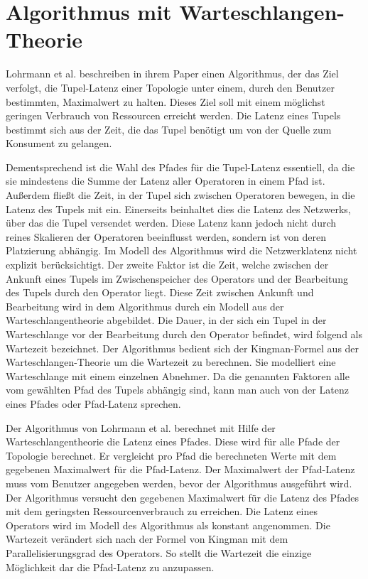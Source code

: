\chapter{Algorithmus mit Warteschlangen-Theorie}

Lohrmann et al. beschreiben in ihrem Paper \cite{lohrmann_elastic_2015} einen Algorithmus, der das Ziel verfolgt, die Tupel-Latenz einer Topologie unter einem, durch den Benutzer bestimmten, Maximalwert zu halten.
Dieses Ziel soll mit einem möglichst geringen Verbrauch von Ressourcen erreicht werden.
Die Latenz eines Tupels bestimmt sich aus der Zeit, die das Tupel benötigt um von der Quelle zum Konsument zu gelangen.

Dementsprechend ist die Wahl des Pfades für die Tupel-Latenz essentiell, da die sie mindestens die Summe der Latenz aller Operatoren in einem Pfad ist.
Außerdem fließt die Zeit, in der Tupel sich zwischen Operatoren bewegen, in die Latenz des Tupels mit ein.
Einerseits beinhaltet dies die Latenz des Netzwerks, über das die Tupel versendet werden.
Diese Latenz kann jedoch nicht durch reines Skalieren der Operatoren beeinflusst werden, sondern ist von deren Platzierung abhängig.
Im Modell des Algorithmus wird die Netzwerklatenz nicht explizit berücksichtigt.
Der zweite Faktor ist die Zeit, welche zwischen der Ankunft eines Tupels im Zwischenspeicher des Operators und der Bearbeitung des Tupels durch den Operator liegt.
Diese Zeit zwischen Ankunft und Bearbeitung wird in dem Algorithmus durch ein Modell aus der Warteschlangentheorie abgebildet.
Die Dauer, in der sich ein Tupel in der Warteschlange vor der Bearbeitung durch den Operator befindet, wird folgend als Wartezeit bezeichnet.
Der Algorithmus bedient sich der Kingman-Formel aus der Warteschlangen-Theorie um die Wartezeit zu berechnen.
Sie modelliert eine Warteschlange mit einem einzelnen Abnehmer.
Da die genannten Faktoren alle vom gewählten Pfad des Tupels abhängig sind, kann man auch von der Latenz eines Pfades oder Pfad-Latenz sprechen.

Der Algorithmus von Lohrmann et al. berechnet mit Hilfe der Warteschlangentheorie die Latenz eines Pfades.
Diese wird für alle Pfade der Topologie berechnet.
Er vergleicht pro Pfad die berechneten Werte mit dem gegebenen Maximalwert für die Pfad-Latenz.
Der Maximalwert der Pfad-Latenz muss vom Benutzer angegeben werden, bevor der Algorithmus ausgeführt wird.
Der Algorithmus versucht den gegebenen Maximalwert für die Latenz des Pfades mit dem geringsten Ressourcenverbrauch zu erreichen.
Die Latenz eines Operators wird im Modell des Algorithmus als konstant angenommen. 
Die Wartezeit verändert sich nach der Formel von Kingman mit dem Parallelisierungsgrad des Operators.
So stellt die Wartezeit die einzige Möglichkeit dar die Pfad-Latenz zu anzupassen.


